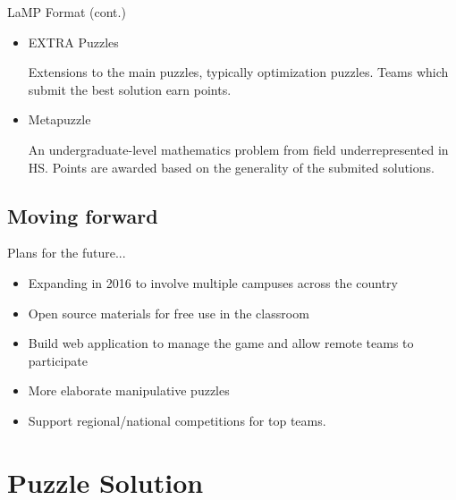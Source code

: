 \documentclass{beamer}
\theoremstyle{theorem}
\theoremstyle{definition}
\newcommand{\<}{\langle}
\renewcommand{\>}{\rangle}
\newcommand{\vpause}{\pause\vspace{1em}}
\begin{document}
\begin{frame}{LaMP Format (cont.)}

  \begin{itemize}
    \item
    EXTRA Puzzles

    Extensions to the main puzzles, typically optimization puzzles.
    Teams which submit the best solution earn points.

    \vpause

    \item
    Metapuzzle

    An undergraduate-level mathematics problem from field underrepresented
    in HS. Points are awarded based on the
    generality of the submited solutions.
  \end{itemize}
\end{frame}

\subsection{Moving forward}

\begin{frame}
  Plans for the future...
  \pause
  \begin{itemize}
    \item Expanding in 2016 to involve multiple campuses
          across the country
    \vpause
    \item Open source materials for free use in the classroom
    \vpause
    \item Build web application to manage the game and allow remote
          teams to participate
    \vpause
    \item More elaborate manipulative puzzles
    \vpause
    \item Support regional/national competitions for top teams.
  \end{itemize}
\end{frame}

\section{Puzzle Solution}
\end{document}
